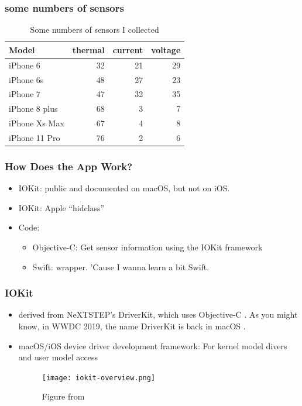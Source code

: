 \documentclass{beamer}
\begin{document}
\begin{frame}
  \frametitle{some numbers of sensors}
  \begin{table}
    \begin{tabular}{|| l | r |  r | r||} 
      \hline
      Model & thermal & current & voltage \\
      \hline\hline
      iPhone 6	& 32 & 21 & 29 \\
      \hline
      iPhone 6s & 48 & 27 & 23 \\
      \hline
      iPhone 7 & 47 & 32 & 35 \\
      \hline
      iPhone 8 plus & 68 & 3 & 7 \\
      \hline
      iPhone Xs Max & 67 & 4 & 8 \\
      \hline
      iPhone 11 Pro & 76 & 2 & 6 \\
      \hline
    \end{tabular}
    \caption{Some numbers of sensors I collected}
  \end{table}
\end{frame}

\begin{frame}
  \frametitle{How Does the App Work?}
  \begin{itemize}
  \item IOKit: public and documented on macOS, but not on iOS.
  \item IOKit: Apple ``hidclass''
  \item Code:
    \begin{itemize}
    \item Objective-C: Get sensor information using the IOKit framework
    \item Swift: wrapper. 'Cause I wanna learn a bit Swift.
    \end{itemize}
  \end{itemize}
\end{frame}

\begin{frame}
  \frametitle{IOKit}
  \begin{itemize}
  \item derived from NeXTSTEP's DriverKit, which uses Objective-C \cite{driverkit}. As you might know, in WWDC 2019, the name DriverKit is back in macOS \cite{appledriverkit}.
  \item macOS/iOS device driver development framework: For kernel model divers and user model access \cite{iokit}
    \begin{figure}
      \texttt{[image: iokit-overview.png]}
      \caption{Figure from \cite{Singh:2006:MOX:1076423}}
    \end{figure}
  \end{itemize}
\end{frame}
\end{document}
